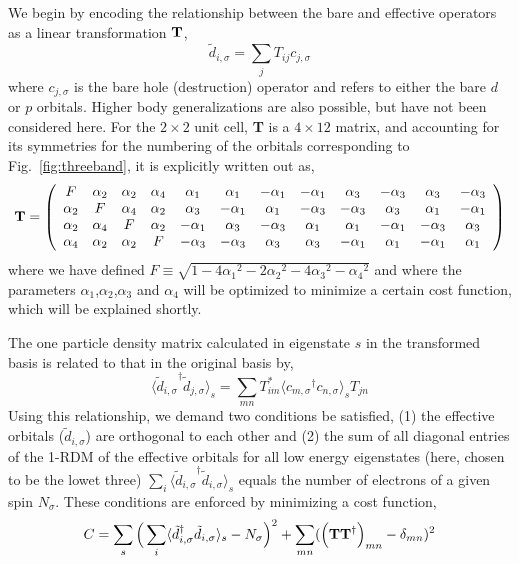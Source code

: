 We begin by encoding the relationship between the bare and effective operators as a linear transformation ${\bf T}$, 
\begin{equation}
	\tilde{d}_{i,\sigma} = \sum_{j} T_{ij} c_{j,\sigma}
\end{equation}
where $c_{j,\sigma}$ is the bare hole (destruction) operator and refers to either the bare $d$ or $p$ orbitals. 
Higher body generalizations are also possible, but have not been considered here. 
For the $2\times2$ unit cell, {\bf T} is a $4 \times 12 $ matrix, and accounting for its symmetries 
for the numbering of the orbitals corresponding to Fig.~\ref{fig:threeband}, it is explicitly written out as, 
\begin{eqnarray}
{\bf T} = 
\left(
\begin{array}{cccccccccccc}
F        & \alpha_2 &        \alpha_2 &  \alpha_4 & \alpha_1 & \alpha_1 & -\alpha_1 & -\alpha_1 & \alpha_3 & -\alpha_3 & \alpha_3 & -\alpha_3 \\
\alpha_2 &  F       &        \alpha_4 &  \alpha_2 & \alpha_3 & -\alpha_1 & \alpha_1 & -\alpha_3 & -\alpha_3 & \alpha_3 & \alpha_1 & -\alpha_1 \\
\alpha_2 & \alpha_4 & F               &  \alpha_2 & -\alpha_1 & \alpha_3 & -\alpha_3 & \alpha_1 & \alpha_1 & -\alpha_1 & -\alpha_3 & \alpha_3 \\
\alpha_4 & \alpha_2 & \alpha_2        &   F       & -\alpha_3 & -\alpha_3 & \alpha_3 & \alpha_3 & -\alpha_1 & \alpha_1 & -\alpha_1 & \alpha_1 \\
\end{array}
\right)
\end{eqnarray}
where we have defined $F \equiv \sqrt{1-4{\alpha_1}^2 - 2{\alpha_2}^2 - 4 {\alpha_3}^2 -{\alpha_4}^2}$ and 
where the parameters $\alpha_1$,$\alpha_2$,$\alpha_3$ and $\alpha_4$ will be optimized to minimize a 
certain cost function, which will be explained shortly. 

The one particle density matrix calculated in eigenstate $s$ in the transformed basis is related to that in the original basis by,
\begin{equation}
	\langle {\tilde{d}_{i,\sigma}}^{\dagger} \tilde{d}_{j,\sigma} \rangle_{s} = \sum_{mn} T^{*}_{im} \langle {c_{m,\sigma}}^{\dagger} c_{n,\sigma} \rangle_{s} T_{jn}
\end{equation}
Using this relationship, we demand two conditions be satisfied, (1) the effective orbitals ($\tilde{d}_{i,\sigma}$) 
are orthogonal to each other and (2) the sum of all diagonal entries of the 1-RDM of the effective orbitals for all low energy eigenstates 
(here, chosen to be the lowet three) 
$\sum_{i} \langle {\tilde{d}_{i,\sigma}}^{\dagger} \tilde{d}_{i,\sigma} \rangle_{s}$ 
equals the number of electrons of a given spin $N_{\sigma}$. 
These conditions are enforced by minimizing a cost function,
\begin{equation}
C = \sum_{s} \Big( \sum_{i} \langle \tilde{d}_{i,\sigma}^{\dagger} \tilde{d}_{i,\sigma} \rangle_{s} - N_{\sigma} \Big)^{2} + \sum_{mn} ( \Big({\bf T} {\bf T}^{\dagger}\Big)_{mn} -\delta_{mn})^{2}
\label{eq:C}
\end{equation} 

